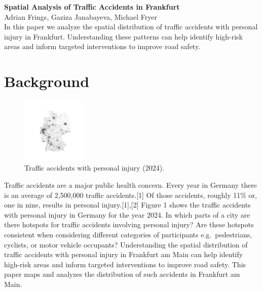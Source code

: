 \documentclass[10pt,a4paper]{article} %
\begin{document}
\begin{center}
    {\large\bfseries Spatial Analysis of Traffic Accidents in Frankfurt}\\[0.5em]
    {\small Adrian Frings, Gaziza Janabayeva, Michael Fryer}\\[1em]
    {\small In this paper we analyze the spatial distribution of traffic accidents with personal injury in Frankfurt. Understanding these patterns can help identify high-risk areas and inform targeted interventions to improve road safety.}
\end{center}

\section*{Background}
\begin{figure}
    \centering
    \vspace{0pt}
    \includegraphics[width=0.28\textwidth]{../src/img/de-2024-bw.png}
    \caption{Traffic accidents with personal injury (2024).}
    \vspace{-30pt}
\end{figure}

Traffic accidents are a major public health concern. Every year in Germany there is an average of 2,500,000 traffic accidents.[1] Of those accidents, roughly 11\% or, one in nine, results in personal injury.[1],[2] Figure 1 shows the traffic accidents with personal injury in Germany for the year 2024. In which parts of a city are there hotspots for traffic accidents involving personal injury? Are these hotspots consistent when considering different categories of participants e.g.\ pedestrians, cyclists, or motor vehicle occupants? Understanding the spatial distribution of traffic accidents with personal injury in Frankfurt am Main can help identify high-risk areas and inform targeted interventions to improve road safety. This paper maps and analyzes the distribution of such accidents in Frankfurt am Main.
\end{document}
